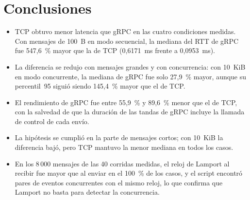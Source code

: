 \section{Conclusiones}


\begin{itemize}
  \item TCP obtuvo menor latencia que gRPC en las cuatro condiciones medidas.
  Con mensajes de 100~B en modo secuencial, la mediana del RTT de gRPC fue
  547,6~\% mayor que la de TCP (0,6171~ms frente a 0,0953~ms).
  \item La diferencia se redujo con mensajes grandes y con concurrencia: con
  10~KiB en modo concurrente, la mediana de gRPC fue solo 27,9~\% mayor, aunque
  su percentil~95 siguió siendo 145,4~\% mayor que el de TCP.
  \item El rendimiento de gRPC fue entre 55,9~\% y 89,6~\% menor que el de TCP,
  con la salvedad de que la duración de las tandas de gRPC incluye la llamada
  de control de cada envío.
  \item La hipótesis se cumplió en la parte de mensajes cortos; con 10~KiB la
  diferencia bajó, pero TCP mantuvo la menor mediana en todos los casos.
  \item En los 8\,000 mensajes de las 40 corridas medidas, el reloj de Lamport
  al recibir fue mayor que al enviar en el 100~\% de los casos, y el script
  encontró pares de eventos concurrentes con el mismo reloj, lo que confirma
  que Lamport no basta para detectar la concurrencia.
\end{itemize}
